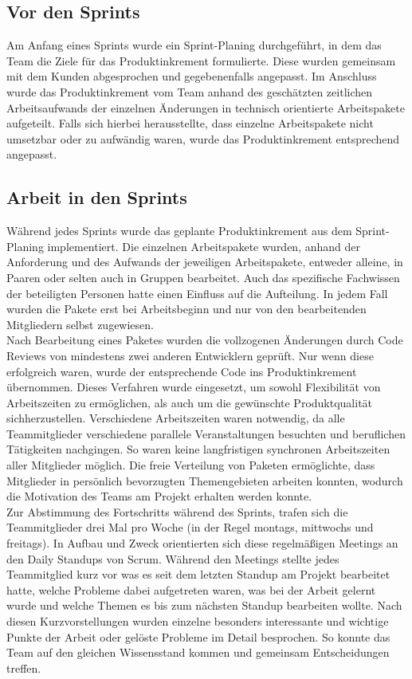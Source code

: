 \documentclass[10pt, a4paper]{article}
\begin{document}
\begin{onehalfspace}
  \subsection{Vor den Sprints}
  Am Anfang eines Sprints wurde ein Sprint-Planing durchgeführt,
  in dem das Team die Ziele für das Produktinkrement formulierte.
  Diese wurden gemeinsam mit dem Kunden abgesprochen und gegebenenfalls angepasst.
  Im Anschluss wurde das Produktinkrement vom Team anhand des geschätzten zeitlichen Arbeitsaufwands der einzelnen Änderungen in technisch orientierte Arbeitspakete aufgeteilt.
  Falls sich hierbei herausstellte, dass einzelne Arbeitspakete nicht umsetzbar oder zu aufwändig waren, wurde das Produktinkrement entsprechend angepasst.

  \subsection{Arbeit in den Sprints}
  Während jedes Sprints wurde das geplante Produktinkrement aus dem Sprint-Planing implementiert.
  Die einzelnen Arbeitspakete wurden, anhand der Anforderung und des Aufwands der jeweiligen Arbeitspakete, entweder alleine, in Paaren oder selten auch in Gruppen bearbeitet.
  Auch das spezifische Fachwissen der beteiligten Personen hatte einen Einfluss auf die Aufteilung.
  In jedem Fall wurden die Pakete erst bei Arbeitsbeginn und nur von den bearbeitenden Mitgliedern selbst zugewiesen.
  \\
  Nach Bearbeitung eines Paketes wurden die vollzogenen Änderungen durch Code Reviews von mindestens zwei anderen Entwicklern geprüft.
  Nur wenn diese erfolgreich waren, wurde der entsprechende Code ins Produktinkrement übernommen.
  Dieses Verfahren wurde eingesetzt, um sowohl Flexibilität von Arbeitszeiten zu ermöglichen, als auch um die gewünschte Produktqualität sichherzustellen.
  Verschiedene Arbeitszeiten waren notwendig, da alle Teammitglieder verschiedene parallele Veranstaltungen besuchten und beruflichen Tätigkeiten nachgingen.
  So waren keine langfristigen synchronen Arbeitszeiten aller Mitglieder möglich.
  Die freie Verteilung von Paketen ermöglichte, dass Mitglieder in persönlich bevorzugten Themengebieten arbeiten konnten, wodurch die Motivation des Teams am Projekt erhalten werden konnte.
  \\
  Zur Abstimmung des Fortschritts während des Sprints, trafen sich die Teammitglieder drei Mal pro Woche (in der Regel montags, mittwochs und freitags).
  In Aufbau und Zweck orientierten sich diese regelmäßigen Meetings an den \glqq Daily Standups\grqq{} von Scrum.
  Während den Meetings stellte jedes Teammitglied kurz vor was es seit dem letzten Standup am Projekt bearbeitet hatte, welche Probleme dabei aufgetreten waren, was bei der Arbeit gelernt wurde und welche Themen es bis zum nächsten Standup bearbeiten wollte.
  Nach diesen Kurzvorstellungen wurden einzelne besonders interessante und wichtige Punkte der Arbeit oder gelöste Probleme im Detail besprochen.
  So konnte das Team auf den gleichen Wissensstand kommen und gemeinsam Entscheidungen treffen.


\end{onehalfspace}
\end{document}
